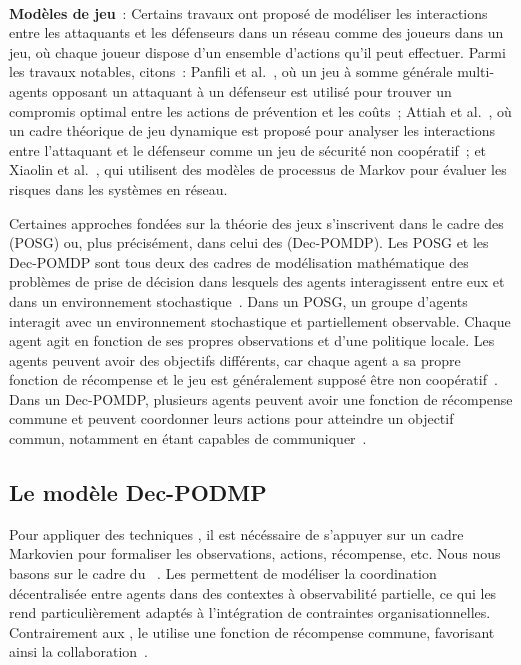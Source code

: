 \

\noindent
\textbf{Modèles de jeu}~: \quad Certains travaux ont proposé de modéliser les interactions entre les attaquants et les défenseurs dans un réseau comme des joueurs dans un jeu, où chaque joueur dispose d'un ensemble d'actions qu'il peut effectuer.
Parmi les travaux notables, citons~: Panfili et al.~\cite{MPanfili2018}, où un jeu à somme générale multi-agents opposant un attaquant à un défenseur est utilisé pour trouver un compromis optimal entre les actions de prévention et les coûts~; Attiah et al.~\cite{AAttiah2018}, où un cadre théorique de jeu dynamique est proposé pour analyser les interactions entre l'attaquant et le défenseur comme un jeu de sécurité non coopératif~; et Xiaolin et al.~\cite{CXiaolin2008}, qui utilisent des modèles de processus de Markov pour évaluer les risques dans les systèmes en réseau.

\noindent
Certaines approches fondées sur la théorie des jeux s'inscrivent dans le cadre des  (POSG) ou, plus précisément, dans celui des  (Dec-POMDP). Les POSG et les Dec-POMDP sont tous deux des cadres de modélisation mathématique des problèmes de prise de décision dans lesquels des agents interagissent entre eux et dans un environnement stochastique~\cite{beynier2010}. Dans un POSG, un groupe d'agents interagit avec un environnement stochastique et partiellement observable. Chaque agent agit en fonction de ses propres observations et d'une politique locale. Les agents peuvent avoir des objectifs différents, car chaque agent a sa propre fonction de récompense et le jeu est généralement supposé être non coopératif~\cite{terry2020pettingzoo}. Dans un Dec-POMDP, plusieurs agents peuvent avoir une fonction de récompense commune et peuvent coordonner leurs actions pour atteindre un objectif commun, notamment en étant capables de communiquer~\cite{bernstein2013}.



\subsection{Le modèle Dec-PODMP}

Pour appliquer des techniques , il est nécéssaire de s'appuyer sur un cadre Markovien pour formaliser les observations, actions, récompense, etc. Nous nous basons sur le cadre du ~\cite{Oliehoek2016}. Les  permettent de modéliser la coordination décentralisée entre agents dans des contextes à observabilité partielle, ce qui les rend particulièrement adaptés à l'intégration de contraintes organisationnelles. Contrairement aux , le  utilise une fonction de récompense commune, favorisant ainsi la collaboration~\cite{Beynier2013}.

